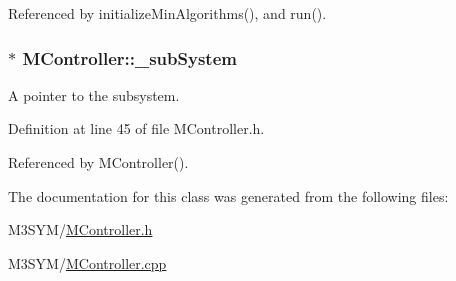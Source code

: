 Referenced by initialize\+Min\+Algorithms(), and run().

\hypertarget{classMController_a638abd4c155c7bafde6b9bff76255f73}{
\subsubsection[{\+\_\+sub\+System}]{$\ast$ M\+Controller\+::\+\_\+sub\+System\hspace{0.3cm}{\ttfamily [private]}}}\label{classMController_a638abd4c155c7bafde6b9bff76255f73}


A pointer to the subsystem. 



Definition at line 45 of file M\+Controller.\+h.



Referenced by M\+Controller().



The documentation for this class was generated from the following files\+:\begin{DoxyCompactItemize}
\item 
M3\+S\+Y\+M/\hyperlink{MController_8h}{M\+Controller.\+h}\item 
M3\+S\+Y\+M/\hyperlink{MController_8cpp}{M\+Controller.\+cpp}\end{DoxyCompactItemize}
